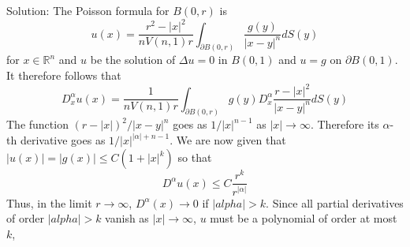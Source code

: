 \documentclass{article}
\theoremstyle{plain}
\numberwithin{thm}{section}
\theoremstyle{plain}
\numberwithin{prop}{section}
\theoremstyle{definition}
\numberwithin{defn}{section}
\theoremstyle{remark}
\numberwithin{equation}{section}
\begin{document}
\begin{enumerate}
Solution: The Poisson formula for $B(0,r)$ is
\[
u(x) = \frac{r^2 - |x|^2}{nV(n, 1)r}\int_{\partial B(0,r)} \frac{g(y)}{|x - y|^n}dS(y)
\]
for $x \in \mathbb{R}^n$ and $u$ be the solution of $\Delta u = 0$ in $B(0,1)$ and $u = g$ on $\partial B(0,1)$. It
therefore follows that
\[
D^\alpha_x u(x) = \frac{1}{nV(n,1)r}\int_{\partial B(0,r)} g(y)D^\alpha_x \frac{r - |x|^2}{|x - y|^n} dS(y)
\]
The function $(r - |x|)^2/|x - y|^n$ goes as $1/|x|^{n-1}$ as $|x| \rightarrow \infty$. Therefore its $\alpha$-th
derivative goes as $1/|x|^{|\alpha|+n-1}$. We are now given that $|u(x)| = |g(x)| \le C(1 + |x|^k)$ so that 
\[
D^\alpha u(x) \le C\frac{r^{k}}{r^{|\alpha|}}
\]
Thus, in the limit $r \rightarrow \infty$, $D^\alpha(x) \rightarrow 0$ if $|alpha| > k$. Since all partial 
derivatives of order $|alpha| > k$ vanish as $|x| \rightarrow \infty$, $u$ must be a polynomial of order at most
$k$,
\end{enumerate}
\end{document}
